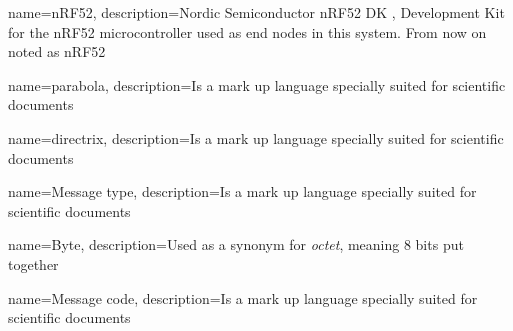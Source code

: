 \pagestyle{empty}



{
	name=nRF52,
    description={Nordic Semiconductor nRF52 DK , Development Kit for the nRF52 microcontroller used as end nodes in this system. From now on noted as nRF52}
}

{
    name=parabola,
    description={Is a mark up language specially suited 
    for scientific documents}
}

{
    name=directrix,
    description={Is a mark up language specially suited 
    for scientific documents}
}

{
    name=Message type,
    description={Is a mark up language specially suited 
    for scientific documents}
}

{
    name=Byte,
    description={Used as a synonym for \textit{octet}, meaning 8 bits put together}
}

{
    name=Message code,
    description={Is a mark up language specially suited 
    for scientific documents}
}















